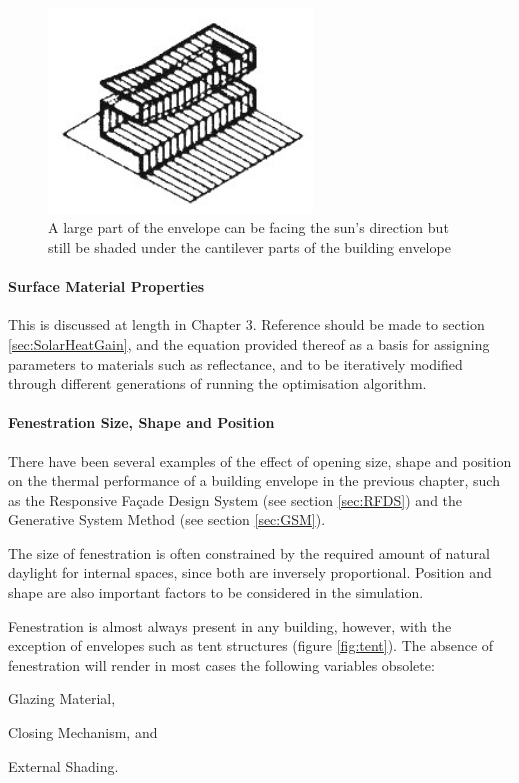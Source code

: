 \begin{figure}[h]
	\centering
	\includegraphics[width=7cm]{./Images/7-Cantilever}
	\caption[Envelope Shading]{A large part of the envelope can be facing the sun's direction but still be shaded under the cantilever parts of the building envelope \cite{foa04}}
	\label{fig:ShadingCntlvr}
\end{figure}

\paragraph{Surface Material Properties}\mbox{}

This is discussed at length in Chapter 3. Reference should be made to section \ref{sec:SolarHeatGain}, and the equation provided thereof as a basis for assigning parameters to materials such as reflectance, and to be iteratively modified through different generations of running the optimisation algorithm.

\paragraph{Fenestration Size, Shape and Position}\mbox{}

There have been several examples of the effect of opening size, shape and position on the thermal performance of a building envelope in the previous chapter, such as the Responsive Fa\c{c}ade Design System (see section \ref{sec:RFDS}) and the Generative System Method (see section \ref{sec:GSM}).

The size of fenestration is often constrained by the required amount of natural daylight for internal spaces, since both are inversely proportional. Position and shape are also important factors to be considered in the simulation.

Fenestration is almost always present in any building, however, with the exception of envelopes such as tent structures (figure \ref{fig:tent}). The absence of fenestration will render in most cases the following variables obsolete: \begin{inparaenum} \item Glazing Material, \item Closing Mechanism, and \item External Shading.\end{inparaenum}

